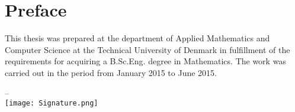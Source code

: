 \chapter{Preface}
This thesis was prepared at the department of Applied Mathematics and Computer Science at the Technical University of Denmark in fulfillment of the requirements for acquiring a B.Sc.Eng. degree in Mathematics. The work was carried out in the period from January 2015 to June 2015.

\vfill

{
\centering
    \thesislocation{} – \thesisdeadline{}\\[1cm]
    \hspace{3cm}\texttt{[image: Signature.png]}\\[1cm]
\begin{flushright}
    \thesisauthor{}
\end{flushright}
}
